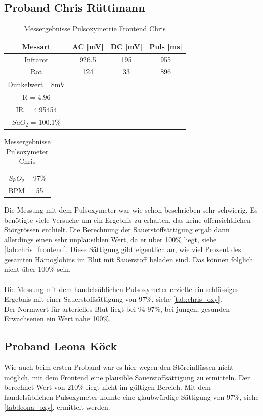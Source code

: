 \documentclass[11pt]{scrartcl}
\begin{document}
    \subsection{Proband Chris Rüttimann}
    \begin {table} [H]
    \centering
    \caption{Messergebnisse Pulsoxymetrie Frontend Chris}
    \label{tab:chris_frontend}
    \begin{tabular}{c|c c c}
        Messart & AC [mV] & DC [mV] & Puls [ms] \\
        \hline
        Infrarot & 926.5 & 195 & 955 \\
        Rot & 124 & 33 & 896 \\
        \hline
        Dunkelwert= 8mV \\
        R = 4.96\\
        IR = 4.95454\\
        $SaO_{2}$ = 100.1\%
    \end{tabular}  
    \end{table}

    \begin {table} [H]
    \centering
    \caption{Messergebnisse Pulsoxymeter Chris}
    \label{tab:chris_oxy}
    \begin{tabular}{c|c}
        $SpO_{2}$ & 97\%  \\
        BPM & 55 
    \end{tabular}  
    \end{table}
    Die Messung mit dem Pulsoxymeter war wie schon beschrieben sehr schwierig.
    Es benötigte viele Versuche um ein Ergebnis zu erhalten, das keine offensichtlichen Störgrössen enthielt.
    Die Berechnung der Sauerstoffsättigung ergab dann allerdings einen sehr unplausiblen Wert, da er über
    100\% liegt, siehe \autoref{tab:chris_frontend}.
    Diese Sättigung gibt eigentlich an, wie viel Prozent des gesamten Hämoglobins im Blut mit Sauerstoff beladen sind.
    Das können folglich nicht über 100\% sein.\\\\
    Die Messung mit dem handelsüblichen Pulsoxymeter erzielte ein schlüssiges Ergebnis mit einer
    Sauerstoffsättigung von 97\%, siehe \autoref{tab:chris_oxy}.\\
    Der Normwert für arterielles Blut liegt bei 94-97\%, bei jungen, gesunden Erwachsenen ein Wert nahe 100\%.

    \subsection{Proband Leona Köck}
    Wie auch beim ersten Proband war es hier wegen den Störeinflüssen nicht möglich, mit dem Frontend eine
    plausible Sauerstoffsättigung zu ermitteln.
    Der berechnet Wert von 210\% liegt nicht im gültigen Bereich.
    Mit dem handelsüblichen Pulsoxymeter konnte eine glaubwürdige Sättigung von 97\%, siehe
    \autoref{tab:leona_oxy}, ermittelt werden.
\end{document}
